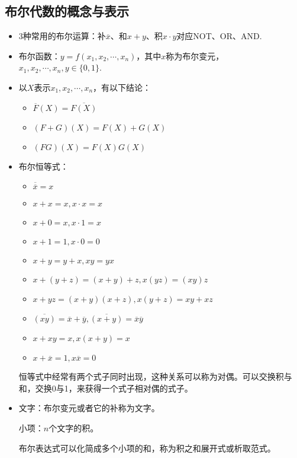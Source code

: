\subsection{布尔代数的概念与表示}
\begin{itemize}
    \item 3种常用的布尔运算：补$\overline x$、和$x+y$、积$x \cdot y$对应NOT、OR、AND.

    \item 布尔函数：$y = f(x_1,x_2,\cdots,x_n)$，其中$x$称为布尔变元，$x_1,x_2,\cdots,x_n,y \in \{0,1\}$.
    \item 以$X$表示$x_1,x_2,\cdots,x_n$，有以下结论：
    \begin{itemize}
        \item $\overline F(X) = \overline{F(X)}$
        \item $(F+G)(X) = F(X) + G(X)$
        \item $(FG)(X) = F(X)G(X)$
    \end{itemize}

    \item 布尔恒等式：
    \begin{itemize}
        \item $\overline {\overline x} = x$
        \item $x+x = x,x \cdot x = x$
        \item $x+0 = x, x \cdot 1 = x$
        \item $x+1 = 1, x \cdot 0 = 0$
        \item $x+y = y+x, xy = yx$
        \item $x+(y+z) = (x+y)+z, x(yz) = (xy)z$
        \item $x + yz = (x+y)(x+z), x(y+z) = xy + xz$
        \item $\overline {(xy)} = \overline x + \overline y,\overline{(x+y)} = \overline x \overline y$
        \item $x + xy = x,x(x+y) = x$
        \item $x + \overline x = 1, x \overline x = 0$
    \end{itemize}
    恒等式中经常有两个式子同时出现，这种关系可以称为对偶。可以交换积与和，交换0与1，来获得一个式子相对偶的式子。

    \item 文字：布尔变元或者它的补称为文字。

    小项：$n$个文字的积。

    布尔表达式可以化简成多个小项的和，称为积之和展开式或析取范式。
\end{itemize}

